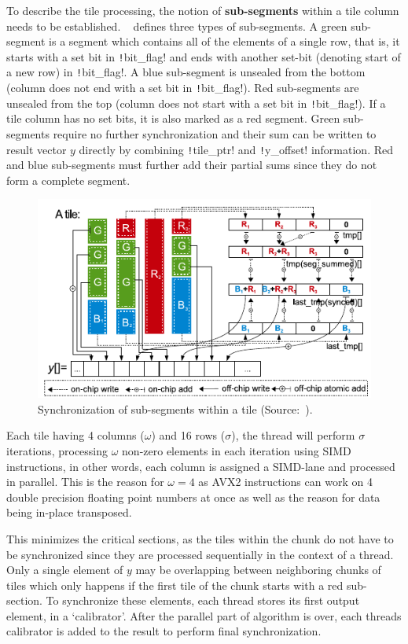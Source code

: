 \documentclass[thesis=M,english]{FITthesis}[2019/12/23]
\newcommand{\csre}[1]{\texttt!#1!}
\begin{document}
To describe the tile processing, the notion of \textbf{sub-segments} within a tile column needs
to be established.
~\cite{liu2015csr5} defines three types of sub-segments. A green sub-segment is a segment which contains
all of the elements of a single row, that is, it starts with a set bit in \csre{bit_flag} and ends with
another set-bit (denoting start of a new row) in \csre{bit_flag}. A blue sub-segment is unsealed from
the bottom (column does not end with a set bit in \csre{bit_flag}).
Red sub-segments are unsealed from the top (column does not start with a set bit in \csre{bit_flag}).
If a tile column has no set bits, it is also marked as a red segment.
Green sub-segments require no further synchronization and their sum can be written to result vector \(y\)
directly by combining \csre{tile_ptr} and \csre{y_offset} information. Red and blue sub-segments must
further add their partial sums since they do not form a complete segment.


\begin{figure}[htp]
    \centering
    \includegraphics[scale=0.7]{static/A_secs.pdf}
    \caption{Synchronization of sub-segments within a tile (Source:~\cite{liu2015csr5}).}
\end{figure}

Each tile having 4 columns (\(\omega{}\)) and 16 rows (\(\sigma{}\)), the
thread will perform \(\sigma{}\) iterations,
processing \(\omega{}\) non-zero elements in each iteration using SIMD instructions, in other words,
each column is assigned a SIMD-lane and processed in parallel. This is the reason
for \(\omega{} = 4\) as AVX2 instructions can work on 4 double precision floating point numbers at once
as well as the reason for data being in-place transposed.


This minimizes the critical sections, as the tiles within the chunk do not have to be
synchronized since they are processed sequentially in the context of a thread. Only a single element of
\(y\) may be overlapping between neighboring chunks of tiles which only happens if the first tile of the
chunk starts with a red sub-section. To synchronize these elements, each thread
stores its first output element, in a `calibrator'. After the parallel part of algorithm is over, each
threads calibrator is added to the result to perform final synchronization.
\end{document}
